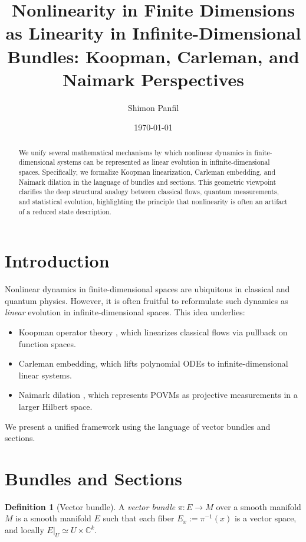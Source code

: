 \documentclass[12pt]{article}
\title{Nonlinearity in Finite Dimensions as Linearity in Infinite-Dimensional Bundles: Koopman, Carleman, and Naimark Perspectives}
\author{Shimon Panfil}
\date{\today}
\theoremstyle{definition}
\newtheorem{definition}{Definition}[section]
\theoremstyle{plain}
\begin{document}
\maketitle

\begin{abstract}
We unify several mathematical mechanisms by which nonlinear dynamics in finite-dimensional systems can be represented as linear evolution in infinite-dimensional spaces. Specifically, we formalize Koopman linearization, Carleman embedding, and Naimark dilation in the language of bundles and sections. This geometric viewpoint clarifies the deep structural analogy between classical flows, quantum measurements, and statistical evolution, highlighting the principle that nonlinearity is often an artifact of a reduced state description.
\end{abstract}

\section{Introduction}

Nonlinear dynamics in finite-dimensional spaces are ubiquitous in classical and quantum physics. However, it is often fruitful to reformulate such dynamics as \emph{linear} evolution in infinite-dimensional spaces. This idea underlies:

\begin{itemize}
    \item Koopman operator theory \cite{Koopman1931}, which linearizes classical flows via pullback on function spaces.
    \item Carleman embedding, which lifts polynomial ODEs to infinite-dimensional linear systems.
    \item Naimark dilation \cite{Naimark1940}, which represents POVMs as projective measurements in a larger Hilbert space.
\end{itemize}

We present a unified framework using the language of vector bundles and sections.

\section{Bundles and Sections}

\begin{definition}[Vector bundle]
A \emph{vector bundle} $\pi: E \to M$ over a smooth manifold $M$ is a smooth manifold $E$ such that each fiber $E_x := \pi^{-1}(x)$ is a vector space, and locally $E|_U \simeq U \times \mathbb{C}^k$.
\end{definition}
\end{document}
